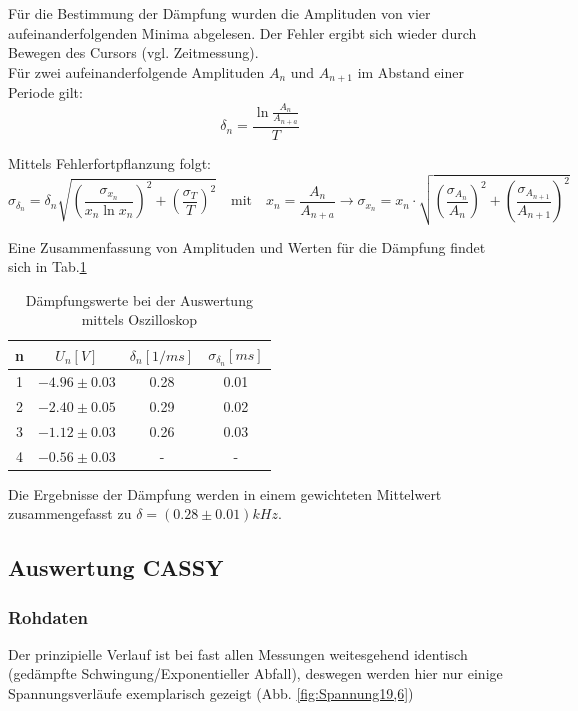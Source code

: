 \documentclass[12pt,a4paper]{article}
\begin{document}
Für die Bestimmung der Dämpfung wurden die Amplituden von vier aufeinanderfolgenden Minima abgelesen. Der Fehler ergibt sich wieder durch Bewegen des Cursors (vgl. Zeitmessung).\\
Für zwei aufeinanderfolgende Amplituden $A_n$ und $A_{n+1}$ im Abstand einer Periode gilt:
\begin{equation}
\delta_n=\frac{\ln{\frac{A_n}{A_{n+a}}}}{T}
\end{equation}

Mittels Fehlerfortpflanzung folgt:
\begin{equation}
\sigma_{\delta_n}=\delta_n \sqrt{(\frac{\sigma_{x_n}}{x_n \ln{x_n}})^2+(\frac{\sigma_T}{T})^2} \quad \text{mit} \quad x_n=\frac{A_n}{A_{n+a}} \rightarrow \sigma_{x_n}=x_n\cdot \sqrt{(\frac{\sigma_{A_n}}{A_n})^2+(\frac{\sigma_{A_{n+1}}}{A_{n+1}})^2}
\end{equation}

Eine Zusammenfassung von Amplituden und Werten für die Dämpfung findet sich in Tab.\ref{tab:DämpfungOszi}
\begin{table}
\begin{center}
\begin{tabular}{|c|c|c|c|}
\hline
n & $U_n[V]$ & $\delta_n[1/ms]$ & $\sigma_{\delta_n}[ms]$\\
\hline
1 & $-4.96 \pm 0.03$ & 0.28 & 0.01\\
\hline
2 & $-2.40 \pm 0.05$ & 0.29 & 0.02\\
\hline
3 & $-1.12 \pm 0.03$ & 0.26 & 0.03\\
\hline
4 & $-0.56 \pm 0.03$ & - & -\\
\hline
\end{tabular}
\end{center}
\caption{Dämpfungswerte bei der Auswertung mittels Oszilloskop}
\label{tab:DämpfungOszi}
\end{table}

Die Ergebnisse der Dämpfung werden in einem gewichteten Mittelwert zusammengefasst zu $\delta=(0.28 \pm 0.01)kHz$.



\subsection{Auswertung CASSY}
\subsubsection{Rohdaten}
Der prinzipielle Verlauf ist bei fast allen Messungen weitesgehend identisch (gedämpfte Schwingung/Exponentieller Abfall), deswegen werden hier nur einige Spannungsverläufe exemplarisch gezeigt (Abb. \ref{fig:Spannung19,6})
\end{document}

